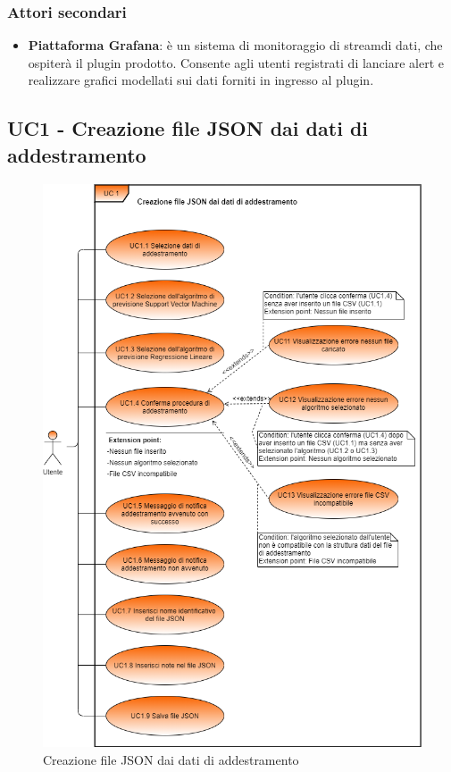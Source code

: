 	\subsubsection{Attori secondari}
	\begin{itemize}
		\item\textbf{Piattaforma Grafana}: è un sistema di monitoraggio di stream\glo di dati, che ospiterà il plugin prodotto. Consente agli utenti registrati di lanciare alert e realizzare grafici modellati sui dati forniti in ingresso al plugin.
	\end{itemize}


	\label{par:UC1}
	\subsection{UC1 - Creazione file JSON dai dati di addestramento}

	\begin{figure}[H]
		\centering
		\includegraphics[scale=0.60]{../Analisi_dei_requisiti/img/Diagrammi_UML/UC1_tool_di_addestramento.png}
		\caption{Creazione file JSON dai dati di addestramento}
	\end{figure}	


